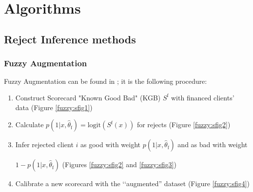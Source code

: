 
\chapter{Algorithms} \label{app1}

\minitoc

\section{Reject Inference methods} \label{app1:reject}

\subsection{Fuzzy Augmentation} \label{fuzzy}

Fuzzy Augmentation can be found in \cite{economix}; it is the following procedure:
\begin{enumerate}
\item Construct Scorecard "Known Good Bad" (KGB) $S^{\text{f}}$ with financed clients' data (Figure \ref{fuzzy:sfig1})
\item Calculate $p(1|x,\hat{\theta}_{\text{f}}) = \text{logit}(S^{\text{f}}(x))$ for rejects (Figure \ref{fuzzy:sfig2})
\item Infer rejected client $i$ as good with weight $p(1|x,\hat{\theta}_{\text{f}})$ and as bad with weight {\begin{sloppypar} $1-p(1|x,\hat{\theta}_{\text{f}})$ (Figures \ref{fuzzy:sfig2} and \ref{fuzzy:sfig3}) \end{sloppypar} }
\item Calibrate a new scorecard with the ‘‘augmented'' dataset (Figure \ref{fuzzy:sfig4})
\end{enumerate}

